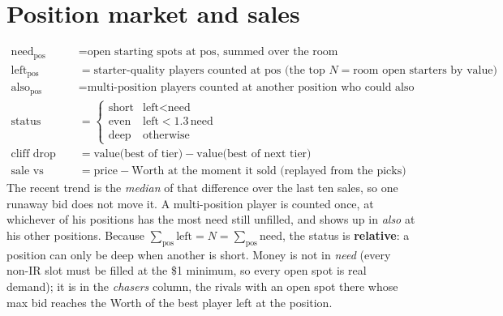 \documentclass[10pt]{article}
\begin{document}
\section{Position market and sales}
\begin{align}
\text{need}_{\text{pos}} &= \text{open starting spots at pos, summed over the room}\\
\text{left}_{\text{pos}} &= \text{starter-quality players counted at pos (the top }N=\text{room open starters by value)}\\
\text{also}_{\text{pos}} &= \text{multi-position players counted at another position who could also play here}\\
\text{status} &= \begin{cases}\text{short}&\text{left}<\text{need}\\ \text{even}&\text{left}<1.3\,\text{need}\\ \text{deep}&\text{otherwise}\end{cases}\\
\text{cliff drop} &= \text{value(best of tier)}-\text{value(best of next tier)}\\
\text{sale vs Worth} &= \text{price}-\text{Worth at the moment it sold (replayed from the picks)}
\end{align}
The recent trend is the \emph{median} of that difference over the last ten sales, so one runaway bid does not move it.
A multi-position player is counted once, at whichever of his positions has the most need still unfilled, and shows up in
\emph{also} at his other positions. Because $\sum_{\text{pos}}\text{left}=N=\sum_{\text{pos}}\text{need}$, the status is
\textbf{relative}: a position can only be deep when another is short. Money is not in \emph{need} (every non-IR slot must
be filled at the \$1 minimum, so every open spot is real demand); it is in the \emph{chasers} column, the rivals with an
open spot there whose max bid reaches the Worth of the best player left at the position.
\end{document}
